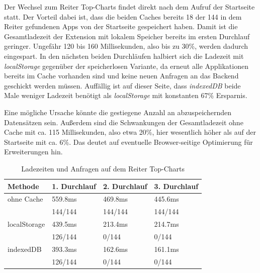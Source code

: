 Der Wechsel zum Reiter \glqq Top-Charts \grqq{} findet direkt nach dem Aufruf der Startseite statt. Der Vorteil dabei ist, dass die beiden Caches bereits 18 der 144 in dem Reiter gefundenen Apps von der Startseite gespeichert haben. Damit ist die Gesamtladezeit der Extension mit lokalem Speicher bereits im ersten Durchlauf geringer. Ungefähr 120 bis 160 Millisekunden, also bis zu 30\%, werden dadurch eingespart. In den nächsten beiden Durchläufen halbiert sich die Ladezeit mit \textit{localStorage} gegenüber der speicherlosen Variante, da erneut alle Applikationen bereits im Cache vorhanden sind und keine neuen Anfragen an das Backend geschickt werden müssen. Auffällig ist auf dieser Seite, dass \textit{indexedDB} beide Male weniger Ladezeit benötigt als \textit{localStorage} mit konstanten 67\% Ersparnis. 

Eine mögliche Ursache könnte die gestiegene Anzahl an abzuspeichernden Datensätzen sein. Außerdem sind die Schwankungen der Gesamtladezeit ohne Cache mit ca. 115 Millisekunden, also etwa 20\%, hier wesentlich höher als auf der Startseite mit ca. 6\%. Das deutet auf eventuelle Browser-seitige Optimierung für Erweiterungen hin.
\begin{table}[h]
	\begin{tabular}{p{2.8cm}C{3.0cm}C{2.8cm}C{3.0cm}}
		\toprule
		\textbf{Methode}	&	\textbf{1. Durchlauf}	&	\textbf{2. Durchlauf}	& \textbf{3. Durchlauf}\\
		\midrule
		ohne Cache	&	559.8ms	&	469.8ms	&	445.6ms	\\
		&	144/144	&	144/144	&	144/144	\\
		
		localStorage	&	439.5ms	&	213.4ms	&	214.7ms	\\
		&	126/144		&	0/144	&	0/144	\\
		
		indexedDB	&	393.3ms	&	162.6ms	&	161.1ms	\\
		&	126/144	&	0/144	&	0/144	\\
		
		\bottomrule
	\end{tabular}
	\caption{Ladezeiten und Anfragen auf dem Reiter \glqq Top-Charts \grqq{}}
	\label{ergebnis22}
\end{table}

